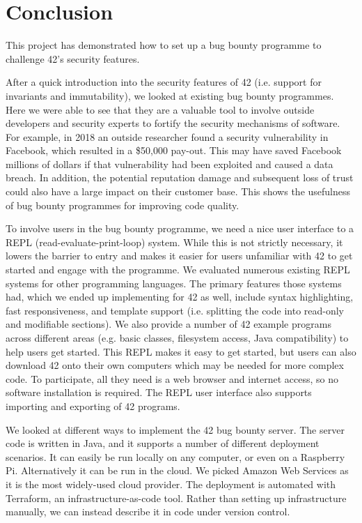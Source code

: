 \chapter{Conclusion}

This project has demonstrated how to set up a bug bounty programme to challenge 42's security features.

After a quick introduction into the security features of 42 (i.e. support for invariants and immutability), we looked at existing bug bounty programmes. Here we were able to see that they are a valuable tool to involve outside developers and security experts to fortify the security mechanisms of software. For example, in 2018 an outside researcher found a security vulnerability in Facebook, which resulted in a \$50,000 pay-out. This may have saved Facebook millions of dollars if that vulnerability had been exploited and caused a data breach\cite{newman-2018}. In addition, the potential reputation damage and subsequent loss of trust could also have a large impact on their customer base. This shows the usefulness of bug bounty programmes for improving code quality.

To involve users in the bug bounty programme, we need a nice user interface to a REPL (read-evaluate-print-loop) system. While this is not strictly necessary, it lowers the barrier to entry and makes it easier for users unfamiliar with 42 to get started and engage with the programme. We evaluated numerous existing REPL systems for other programming languages. The primary features those systems had, which we ended up implementing for 42 as well, include syntax highlighting, fast responsiveness, and template support (i.e. splitting the code into read-only and modifiable sections). We also provide a number of 42 example programs across different areas (e.g. basic classes, filesystem access, Java compatibility) to help users get started. This REPL makes it easy to get started, but users can also download 42 onto their own computers which may be needed for more complex code. To participate, all they need is a web browser and internet access, so no software installation is required. The REPL user interface also supports importing and exporting of 42 programs.

We looked at different ways to implement the 42 bug bounty server. The server code is written in Java, and it supports a number of different deployment scenarios. It can easily be run locally on any computer, or even on a Raspberry Pi. Alternatively it can be run in the cloud. We picked Amazon Web Services as it is the most widely-used cloud provider. The deployment is automated with Terraform, an infrastructure-as-code tool. Rather than setting up infrastructure manually, we can instead describe it in code under version control.

